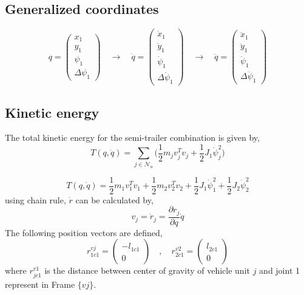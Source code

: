 \documentclass[12pt]{article}
\begin{document}
\subsection{Generalized coordinates}
\begin{equation} \label{Generalized_coordinates_eq}
    q = \begin{pmatrix} x_{1} \\ y_{1} \\ \psi_1 \\ \Delta \psi_1 \end{pmatrix} \quad \longrightarrow \quad \dot{q} = \begin{pmatrix} \dot{x}_{1} \\ \dot{y}_{1} \\ \dot{\psi} _1 \\ \Delta \dot{\psi}_1 \end{pmatrix} \quad \longrightarrow \quad \ddot{q} = \begin{pmatrix} \ddot{x}_{1} \\ \ddot{y}_{1} \\ \ddot{\psi} _1 \\ \Delta \ddot{\psi}_1 \end{pmatrix}
\end{equation}
\subsection{Kinetic energy}
The total kinetic energy for the semi-trailer combination is given by,
\begin{equation}
    T(q,\dot{q}) = \sum_{j \in \mathcal{N}_u} \Big( \frac{1}{2}m_j v_j^T v_j + \frac{1}{2}J_1\dot{\psi}_j^2 \Big) 
\end{equation}

\begin{equation}
    T(q,\dot{q}) = \frac{1}{2}m_1 v_1^T v_1 + \frac{1}{2}m_2 v_2^T v_2 + \frac{1}{2}J_1\dot{\psi}_1^2 + \frac{1}{2}J_2\dot{\psi}_2^2
\end{equation}
using chain rule, $\dot{r}$ can be calculated by,
\begin{equation}
    v_j = \dot{r}_j = \frac{\partial r _j}{\partial q}\dot{q}
\end{equation}
The following position vectors are defined,
\begin{equation}
    r_{1c1}^{vj} = \begin{pmatrix} - l_{1c1} \\ 0 \end{pmatrix} \quad , \quad r_{2c1}^{v2} = \begin{pmatrix} l_{2c1} \\ 0 \end{pmatrix}
\end{equation}
where $r_{jc1}^{v1}$ is the distance between center of gravity of vehicle unit $j$ and joint 1 represent in Frame $\{vj \}$.
\end{document}
